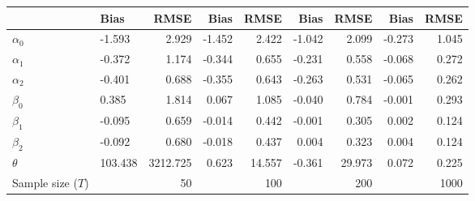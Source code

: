
\begin{tabular}[t]{llrrrrrrr}
\toprule
  & Bias & RMSE & Bias & RMSE & Bias & RMSE & Bias & RMSE\\
\midrule
$\alpha_{0}$ & -1.593 & 2.929 & -1.452 & 2.422 & -1.042 & 2.099 & -0.273 & 1.045\\
$\alpha_{1}$ & -0.372 & 1.174 & -0.344 & 0.655 & -0.231 & 0.558 & -0.068 & 0.272\\
$\alpha_{2}$ & -0.401 & 0.688 & -0.355 & 0.643 & -0.263 & 0.531 & -0.065 & 0.262\\
$\beta_{0}$ & 0.385 & 1.814 & 0.067 & 1.085 & -0.040 & 0.784 & -0.001 & 0.293\\
$\beta_{1}$ & -0.095 & 0.659 & -0.014 & 0.442 & -0.001 & 0.305 & 0.002 & 0.124\\
$\beta_{2}$ & -0.092 & 0.680 & -0.018 & 0.437 & 0.004 & 0.323 & 0.004 & 0.124\\
$\theta$ & 103.438 & 3212.725 & 0.623 & 14.557 & -0.361 & 29.973 & 0.072 & 0.225\\
Sample size ($T$) &  & 50 &  & 100 &  & 200 &  & 1000\\
\bottomrule
\end{tabular}
